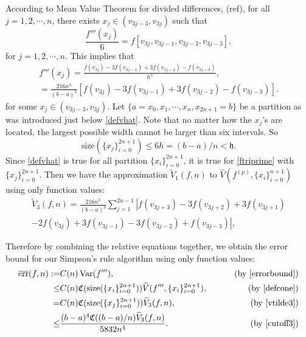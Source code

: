 \documentclass[draft]{iitthesis}
\DeclareMathOperator{\Var}{Var}
\theoremstyle{definition}
\theoremstyle{remark}
\begin{document}


According to Mean Value Theorem for divided differences, (ref), for all $j=1,2,\cdots,n$, there exists $x_j\in (v_{3j-3},v_{3j})$ such that
\begin{equation*}
    \frac{f'''(x_j)}{6}=f[v_{3j},v_{3j-1},v_{3j-2},v_{3j-3}],
\end{equation*}
for $j = 1, 2, \cdots, n.$ This implies that
\begin{multline}\label{ftriprime}
  f'''(x_j)=\frac{f(v_{3j})-3f(v_{3j-1})+3f(v_{3j-2})-f(v_{3j-3})}{h^3},\\=\frac{216n^3}{(b-a)^3}[f(v_{3j})-3f(v_{3j-1})+3f(v_{3j-2})-f(v_{3j-3})].
\end{multline}
for some $x_j\in (v_{3j-3},v_{3j})$. Let $\{a=x_{0}, x_{1},\cdots,x_{n},x_{2n+1}=b\}$ be a partition as was introduced just below \eqref{defvhat}. Note that no matter how the $x_j$'s are located, the largest possible width cannot be larger than six intervals. So
\begin{equation}\label{cutoff3}
    \text{size}(\{x_j\}_{i=0}^{2n+1})\leq 6h=(b-a)/n<\mathfrak{h}.
\end{equation}
Since \eqref{defvhat} is true for all partition $\{x_i\}_{i=0}^{2n+1}$, it is true for \eqref{ftriprime} with $\{x_j\}_{i=0}^{2n+1}$. Then we have the approximation $\widetilde{V}_1(f,n)$ to $\widehat{V}(f^{(p)},\{x_i\}_{i=0}^{n+1})$ using only function values:
\begin{multline}\label{vtilde3}
\widetilde{V}_3(f,n)=\frac{216n^3}{(b-a)^3}\sum_{j=1}^{2n-1}\left|f(v_{3j+3})-3f(v_{3j+2})+3f(v_{3j+1})\right.\\\left.-2f(v_{3j})+3f(v_{3j-1})-3f(v_{3j-2})+f(v_{3j-3})\right|,
\end{multline}

Therefore by combining the relative equations together, we obtain the error bound for our Simpson's rule algorithm using only function values:
\begin{align*}
\overline{\text{err}}(f,n):=&C(n)\Var(f'''),\qquad &\text{ (by \eqref{errorbound})}\\
\leq & C(n)\mathfrak{C}(\text{size}(\{x_i\}_{i=0}^{2n+1}))\widehat{V}(f''',\{x_i\}_{i=0}^{2n+1}), \qquad &\text{ (by \eqref{defcone})}\\
=& C(n)\mathfrak{C}(\text{size}(\{x_j\}_{i=0}^{2n+1}))\widetilde{V}_3(f,n), \qquad &\text{ (by \eqref{vtilde3})}\\
  \leq & \frac{(b-a)^4\mathfrak{C}((b-a)/n)\widetilde{V}_3(f,n)}{5832n^4}.\qquad &\text{ (by \eqref{cutoff3})}
\end{align*}
\end{document}
